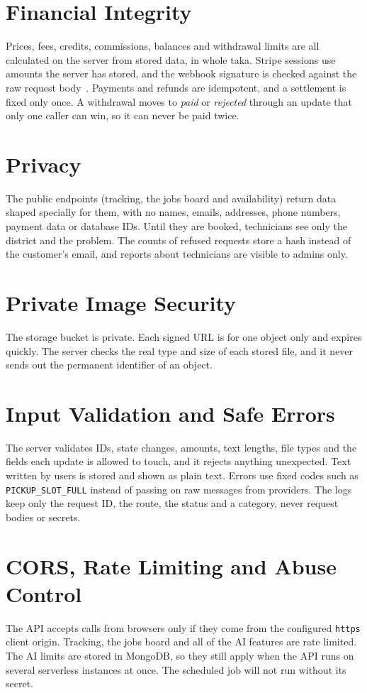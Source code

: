 \documentclass{standalone}
\begin{document}
\section{Financial Integrity}
Prices, fees, credits, commissions, balances and withdrawal limits are all calculated on the server from stored data, in whole taka. Stripe sessions use amounts the server has stored, and the webhook signature is checked against the raw request body~\cite{stripewebhooks}. Payments and refunds are idempotent, and a settlement is fixed only once. A withdrawal moves to \emph{paid} or \emph{rejected} through an update that only one caller can win, so it can never be paid twice.

\section{Privacy}
The public endpoints (tracking, the jobs board and availability) return data shaped specially for them, with no names, emails, addresses, phone numbers, payment data or database IDs. Until they are booked, technicians see only the district and the problem. The counts of refused requests store a hash instead of the customer's email, and reports about technicians are visible to admins only.

\section{Private Image Security}
The storage bucket is private. Each signed URL is for one object only and expires quickly. The server checks the real type and size of each stored file, and it never sends out the permanent identifier of an object.

\section{Input Validation and Safe Errors}
The server validates IDs, state changes, amounts, text lengths, file types and the fields each update is allowed to touch, and it rejects anything unexpected. Text written by users is stored and shown as plain text. Errors use fixed codes such as \texttt{PICKUP\_SLOT\_FULL} instead of passing on raw messages from providers. The logs keep only the request ID, the route, the status and a category, never request bodies or secrets.

\section{CORS, Rate Limiting and Abuse Control}
The API accepts calls from browsers only if they come from the configured \texttt{https} client origin. Tracking, the jobs board and all of the AI features are rate limited. The AI limits are stored in MongoDB, so they still apply when the API runs on several serverless instances at once. The scheduled job will not run without its secret.
\end{document}
